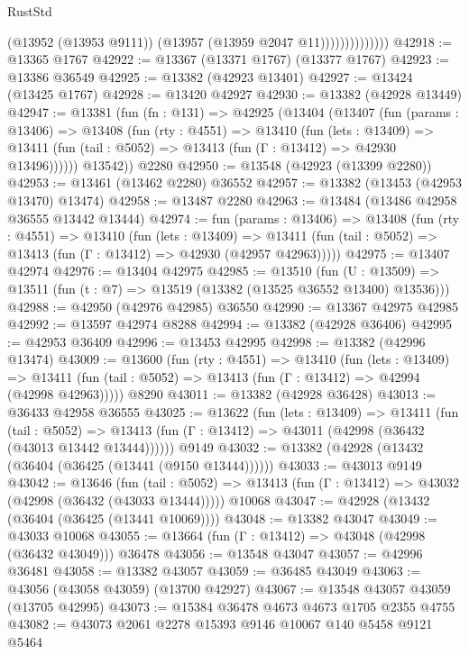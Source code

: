 \begin{lexlean}{RustStd}
\begin{coremodule}
                            (@13952 (@13953 @9111))
                            (@13957 (@13959 @2047 @11))))))))))))))
@42918 := @13365 @1767
@42922 := @13367 (@13371 @1767) (@13377 @1767)
@42923 := @13386 @36549
@42925 := @13382 (@42923 @13401)
@42927 := @13424 (@13425 @1767)
@42928 := @13420 @42927
@42930 := @13382 (@42928 @13449)
@42947 := @13381
    (fun (fn : @131) =>
    @42925
      (@13404
        (@13407
          (fun (params : @13406) =>
          @13408
            (fun (rty : @4551) =>
            @13410
              (fun (lets : @13409) =>
              @13411 (fun (tail : @5052) => @13413 (fun (Γ : @13412) => @42930 @13496))))))
        @13542))
    @2280
@42950 := @13548 (@42923 (@13399 @2280))
@42953 := @13461 (@13462 @2280) @36552
@42957 := @13382 (@13453 (@42953 @13470) @13474)
@42958 := @13487 @2280
@42963 := @13484 (@13486 @42958 @36555 @13442 @13444)
@42974 := fun (params : @13406) =>
  @13408
    (fun (rty : @4551) =>
    @13410
      (fun (lets : @13409) =>
      @13411 (fun (tail : @5052) => @13413 (fun (Γ : @13412) => @42930 (@42957 @42963)))))
@42975 := @13407 @42974
@42976 := @13404 @42975
@42985 := @13510
    (fun (U : @13509) => @13511 (fun (t : @7) => @13519 (@13382 (@13525 @36552 @13400) @13536)))
@42988 := @42950 (@42976 @42985) @36550
@42990 := @13367 @42975 @42985
@42992 := @13597 @42974 @8288
@42994 := @13382 (@42928 @36406)
@42995 := @42953 @36409
@42996 := @13453 @42995
@42998 := @13382 (@42996 @13474)
@43009 := @13600
    (fun (rty : @4551) =>
    @13410
      (fun (lets : @13409) =>
      @13411 (fun (tail : @5052) => @13413 (fun (Γ : @13412) => @42994 (@42998 @42963)))))
    @8290
@43011 := @13382 (@42928 @36428)
@43013 := @36433 @42958 @36555
@43025 := @13622
    (fun (lets : @13409) =>
    @13411
      (fun (tail : @5052) =>
      @13413 (fun (Γ : @13412) => @43011 (@42998 (@36432 (@43013 @13442 @13444))))))
    @9149
@43032 := @13382 (@42928 (@13432 (@36404 (@36425 (@13441 (@9150 @13444))))))
@43033 := @43013 @9149
@43042 := @13646
    (fun (tail : @5052) => @13413 (fun (Γ : @13412) => @43032 (@42998 (@36432 (@43033 @13444)))))
    @10068
@43047 := @42928 (@13432 (@36404 (@36425 (@13441 @10069))))
@43048 := @13382 @43047
@43049 := @43033 @10068
@43055 := @13664 (fun (Γ : @13412) => @43048 (@42998 (@36432 @43049))) @36478
@43056 := @13548 @43047
@43057 := @42996 @36481
@43058 := @13382 @43057
@43059 := @36485 @43049
@43063 := @43056 (@43058 @43059) (@13700 @42927)
@43067 := @13548 @43057 @43059 (@13705 @42995)
@43073 := @15384 @36478 @4673 @4673 @1705 @2355 @4755
@43082 := @43073 @2061 @2278 @15393 @9146 @10067 @140 @5458 @9121 @5464

\end{coremodule}
\end{lexlean}
